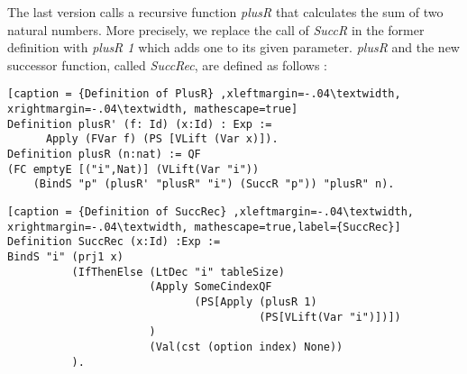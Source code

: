 The last version calls a recursive function \textit{plusR} that calculates the sum of two natural numbers. More precisely, we replace the call of \textit{SuccR} in the former definition with \textit{plusR 1} which adds one to its given parameter. \textit{plusR} and the new successor function, called \textit{SuccRec}, are defined as follows : 
\begin{lstlisting}[caption = {Definition of PlusR} ,xleftmargin=-.04\textwidth,
xrightmargin=-.04\textwidth, mathescape=true]
Definition plusR' (f: Id) (x:Id) : Exp :=
      Apply (FVar f) (PS [VLift (Var x)]). 
Definition plusR (n:nat) := QF 
(FC emptyE [("i",Nat)] (VLift(Var "i")) 
    (BindS "p" (plusR' "plusR" "i") (SuccR "p")) "plusR" n).
\end{lstlisting}  
 
\begin{lstlisting}[caption = {Definition of SuccRec} ,xleftmargin=-.04\textwidth,
xrightmargin=-.04\textwidth, mathescape=true,label={SuccRec}]
Definition SuccRec (x:Id) :Exp :=
BindS "i" (prj1 x) 
          (IfThenElse (LtDec "i" tableSize) 
                      (Apply SomeCindexQF 
                             (PS[Apply (plusR 1) 
                                       (PS[VLift(Var "i")])])
                      ) 
                      (Val(cst (option index) None))
          ).
\end{lstlisting} 
